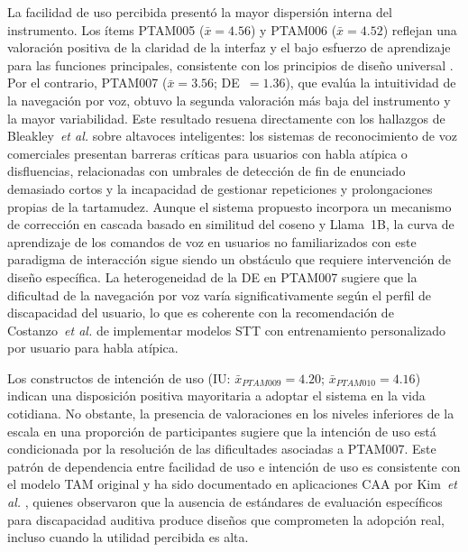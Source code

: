\documentclass[journal]{IEEEtran}
\begin{document}
			La facilidad de uso percibida present\'o la mayor dispersi\'on interna del instrumento. Los \'items PTAM005 ($\bar{x}=4.56$) y PTAM006 ($\bar{x}=4.52$) reflejan una valoraci\'on positiva de la claridad de la interfaz y el bajo esfuerzo de aprendizaje para las funciones principales, consistente con los principios de dise\~no universal \cite{story1998}. Por el contrario, PTAM007 ($\bar{x}=3.56$; DE~$=1.36$), que eval\'ua la intuitividad de la navegaci\'on por voz, obtuvo la segunda valoraci\'on m\'as baja del instrumento y la mayor variabilidad. Este resultado resuena directamente con los hallazgos de Bleakley~\textit{et al.} \cite{bleakley2022} sobre altavoces inteligentes: los sistemas de reconocimiento de voz comerciales presentan barreras cr\'iticas para usuarios con habla at\'ipica o disfluencias, relacionadas con umbrales de detecci\'on de fin de enunciado demasiado cortos y la incapacidad de gestionar repeticiones y prolongaciones propias de la tartamudez. Aunque el sistema propuesto incorpora un mecanismo de correcci\'on en cascada basado en similitud del coseno y Llama~1B, la curva de aprendizaje de los comandos de voz en usuarios no familiarizados con este paradigma de interacci\'on sigue siendo un obst\'aculo que requiere intervenci\'on de dise\~no espec\'ifica. La heterogeneidad de la DE en PTAM007 sugiere que la dificultad de la navegaci\'on por voz var\'ia significativamente seg\'un el perfil de discapacidad del usuario, lo que es coherente con la recomendaci\'on de Costanzo~\textit{et al.} \cite{costanzo2023} de implementar modelos STT con entrenamiento personalizado por usuario para habla at\'ipica.
			
			Los constructos de intenci\'on de uso (IU: $\bar{x}_{PTAM009}=4.20$; $\bar{x}_{PTAM010}=4.16$) indican una disposici\'on positiva mayoritaria a adoptar el sistema en la vida cotidiana. No obstante, la presencia de valoraciones en los niveles inferiores de la escala en una proporci\'on de participantes sugiere que la intenci\'on de uso est\'a condicionada por la resoluci\'on de las dificultades asociadas a PTAM007. Este patr\'on de dependencia entre facilidad de uso e intenci\'on de uso es consistente con el modelo TAM original \cite{davis1989} y ha sido documentado en aplicaciones CAA por Kim~\textit{et al.} \cite{kim2024}, quienes observaron que la ausencia de est\'andares de evaluaci\'on espec\'ificos para discapacidad auditiva produce dise\~nos que comprometen la adopci\'on real, incluso cuando la utilidad percibida es alta.
			
\end{document}
